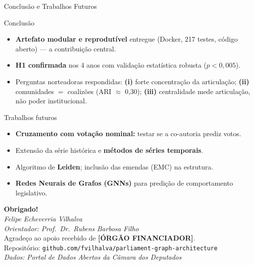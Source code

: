 \documentclass{beamer}
\begin{document}
\begin{frame}{Conclusão e Trabalhos Futuros}
\begin{block}{Conclusão}
\begin{itemize}\footnotesize
  \item \textbf{Artefato modular e reprodutível} entregue (Docker, 217 testes, código aberto) — a contribuição central.
  \item \textbf{H1 confirmada} nos 4 anos com validação estatística robusta ($p < 0{,}005$).
  \item Perguntas norteadoras respondidas: \textbf{(i)} forte concentração da articulação; \textbf{(ii)} comunidades $=$ coalizões (ARI $\approx$ 0,30); \textbf{(iii)} centralidade mede articulação, não poder institucional.
\end{itemize}
\end{block}

\begin{block}{Trabalhos futuros}
\begin{itemize}\footnotesize
  \item \textbf{Cruzamento com votação nominal:} testar se a co-autoria prediz votos.
  \item Extensão da série histórica e \textbf{métodos de séries temporais}.
  \item Algoritmo de \textbf{Leiden}; inclusão das emendas (EMC) na estrutura.
  \item \textbf{Redes Neurais de Grafos (GNNs)} para predição de comportamento legislativo.
\end{itemize}
\end{block}
\end{frame}

\begin{frame}
  \centering
  \vspace{1cm}
  {\Large \textbf{Obrigado!}}\\[0.8cm]
  \textit{Felipe Echeverria Vilhalva}\\
  \textit{Orientador: Prof.\ Dr.\ Rubens Barbosa Filho}\\[0.6cm]
  \footnotesize Agradeço ao apoio recebido de \textbf{[ÓRGÃO FINANCIADOR]}.\\[0.6cm]
  \small
  Repositório: \texttt{github.com/fvilhalva/parliament-graph-architecture}\\[0.3cm]
  \textit{Dados: Portal de Dados Abertos da Câmara dos Deputados}
\end{frame}
\end{document}
